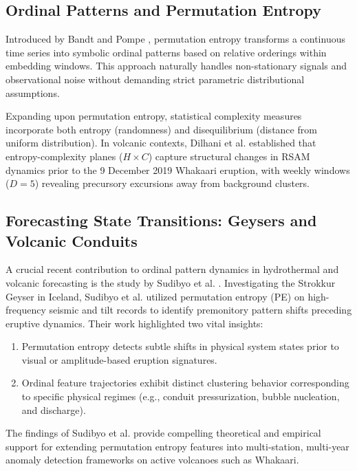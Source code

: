\documentclass[journal]{IEEEtran}
\begin{document}
\subsection{Ordinal Patterns and Permutation Entropy}
Introduced by Bandt and Pompe \cite{bandt2002permutation}, permutation entropy transforms a continuous time series into symbolic ordinal patterns based on relative orderings within embedding windows. This approach naturally handles non-stationary signals and observational noise without demanding strict parametric distributional assumptions.

Expanding upon permutation entropy, statistical complexity measures \cite{lamberti2004intensive} incorporate both entropy (randomness) and disequilibrium (distance from uniform distribution). In volcanic contexts, Dilhani et al. \cite{dilhani2023multiscale} established that entropy-complexity planes ($H \times C$) capture structural changes in RSAM dynamics prior to the 9 December 2019 Whakaari eruption, with weekly windows ($D=5$) revealing precursory excursions away from background clusters.

\subsection{Forecasting State Transitions: Geysers and Volcanic Conduits}
A crucial recent contribution to ordinal pattern dynamics in hydrothermal and volcanic forecasting is the study by Sudibyo et al. \cite{sudibyo2022eruption}. Investigating the Strokkur Geyser in Iceland, Sudibyo et al. utilized permutation entropy (PE) on high-frequency seismic and tilt records to identify premonitory pattern shifts preceding eruptive dynamics. Their work highlighted two vital insights:
\begin{enumerate}
    \item Permutation entropy detects subtle shifts in physical system states prior to visual or amplitude-based eruption signatures.
    \item Ordinal feature trajectories exhibit distinct clustering behavior corresponding to specific physical regimes (e.g., conduit pressurization, bubble nucleation, and discharge).
\end{enumerate}
The findings of Sudibyo et al. \cite{sudibyo2022eruption} provide compelling theoretical and empirical support for extending permutation entropy features into multi-station, multi-year anomaly detection frameworks on active volcanoes such as Whakaari.
\end{document}
